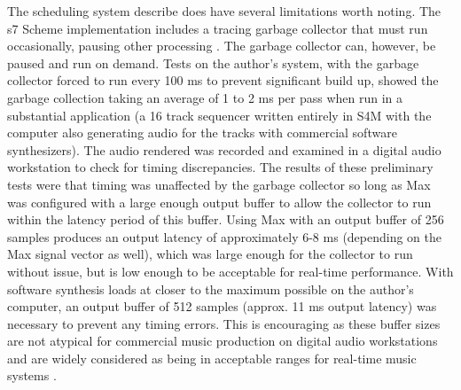 \documentclass[acmsmall]{acmart}
\begin{document}
The scheduling system describe does have several limitations worth noting.
The s7 Scheme implementation includes a tracing garbage collector 
that must run occasionally, pausing other processing \cite{Matheussen2020}.
The garbage collector can, however, be paused and run on demand. Tests on the author's
system, with the garbage collector forced to run every 100 ms to prevent
significant build up, showed the garbage collection taking an average of 1 to 2 ms per pass
when run in a substantial application (a 16 track sequencer written entirely in S4M
with the computer also generating audio for the tracks with commercial
software synthesizers).  
The audio rendered was recorded and examined
in a digital audio workstation to check for timing discrepancies. The
results of these preliminary tests were that timing was unaffected by the 
garbage collector so long as Max was configured with 
a large enough output buffer to allow the collector to run within the 
latency period of this buffer.
Using Max with an output buffer of 256 samples produces an output latency
of approximately 6-8 ms (depending on the Max signal vector as well), which
was large enough for the collector to run without issue, but is 
low enough to be acceptable for real-time performance. With software synthesis
loads at closer to the maximum possible on the author's computer,
an output buffer of 512 samples (approx. 11 ms output latency) was necessary to prevent
any timing errors. This is encouraging as these buffer sizes are not atypical
for commercial music production on digital audio workstations and are widely
considered as being in acceptable ranges for real-time music systems \cite{Brandt1998}.
\end{document}
